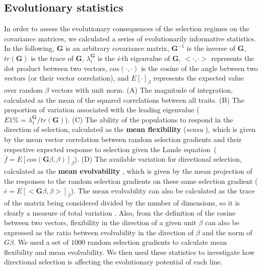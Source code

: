 \begin{refsection}
\subsection{Evolutionary statistics}

In order to assess the evolutionary consequences of the selection
regimes on the covariance matrices, we calculated a series of
evolutionarily informative statistics. In the following, \(\mathbf{G}\)
is an arbitrary covariance matrix, \(\mathbf{G}^{-1}\) is the inverse of
\(\mathbf{G}\), \(tr(\mathbf{G})\) is the trace of \(\mathbf{G}\),
\(\lambda_i^\mathbf{G}\) is the \emph{i}-th eigenvalue of
\(\mathbf{G}\), \(<\cdot, \cdot>\) represents the dot product between
two vectors, \(cos(\cdot, \cdot)\) is the cosine of the angle between
two vectors (or their vector correlation), and \(E[\cdot]_\beta\)
represents the expected value over random \(\beta\) vectors with unit
norm. (A) The magnitude of integration, calculated as the mean of the
squared correlations between all traits. (B) The proportion of variation
associated with the leading eigenvalue
(\(E1\% = \lambda_1^{\mathbf{G}} / tr(\mathbf{G})\)). (C) The ability of
the populations to respond in the direction of selection, calculated as
the \textbf{mean flexibility} (\emph{sensu} \textcite{Marroig2009-gf}), which is
given by the mean vector correlation between random selection gradients
and their respective expected response to selection given the Lande
equation~(\(\bar{f} = E[cos(\mathbf{G}\beta,\beta)]_\beta\)). (D) The
available variation for directional selection, calculated as the
\textbf{mean evolvability} \parencite{Hansen2008-kz}, which is given by the mean
projection of the responses to the random selection gradients on these
same selection gradient
(\(\bar{e} = E[<\mathbf{G}\beta,\beta>]_\beta\)). The mean evolvability
can also be calculated as the trace of the matrix being considered
divided by the number of dimensions, so it is clearly a measure of total
variation \parencite{Hansen2008-kz}. Also, from the definition of the cosine
between two vectors, flexibility in the direction of a given unit
\(\beta\) can also be expressed as the ratio between evolvability in the
direction of \(\beta\) and the norm of \(G\beta\). We used a set of
\(1000\) random selection gradients to calculate mean flexibility and
mean evolvability. We then used these statistics to investigate how
directional selection is affecting the evolutionary potential of each
line.


\end{refsection}
